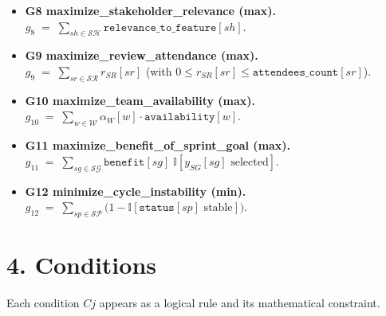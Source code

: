 \documentclass[11pt,a4paper]{article}
\begin{document}
\begin{itemize}[leftmargin=2em]
  \item \textbf{G8 \; maximize\_stakeholder\_relevance (max).}\\
  $g_8 \;=\; \displaystyle \sum_{sh \in \mathcal{SH}} \texttt{relevance\_to\_feature}[sh]$.

  \item \textbf{G9 \; maximize\_review\_attendance (max).}\\
  $g_9 \;=\; \displaystyle \sum_{sr \in \mathcal{SR}} r_{SR}[sr]$ \quad (with $0 \le r_{SR}[sr] \le \texttt{attendees\_count}[sr]$).

  \item \textbf{G10 \; maximize\_team\_availability (max).}\\
  $g_{10} \;=\; \displaystyle \sum_{w \in \mathcal{W}} \alpha_W[w]\cdot \texttt{availability}[w]$.

  \item \textbf{G11 \; maximize\_benefit\_of\_sprint\_goal (max).}\\
  $g_{11} \;=\; \displaystyle \sum_{sg \in \mathcal{SG}} \texttt{benefit}[sg]\;\mathbb{I}[y_{SG}[sg]\text{ selected}]$.

  \item \textbf{G12 \; minimize\_cycle\_instability (min).}\\
  $g_{12} \;=\; \displaystyle \sum_{sp \in \mathcal{SP}} \big(1 - \mathbb{I}[\texttt{status}[sp]\text{ stable}]\big)$.
\end{itemize}

\section{4. Conditions}
Each condition $Cj$ appears as a logical rule and its mathematical constraint.
\end{document}
